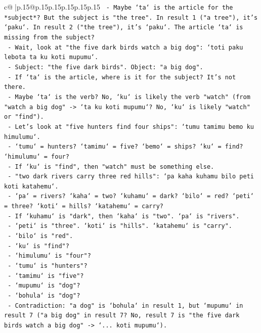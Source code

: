 \documentclass{article}
\begin{document}
{\begin{supertabular}{c@{$\;$}|p{.15\linewidth}@{}p{.15\linewidth}p{.15\linewidth}p{.15\linewidth}p{.15\linewidth}p{.15\linewidth}}
{{{\texttt{         {-} Maybe `ta` is the article for the *subject*? But the subject is "the tree". In result 1 ("a tree"), it's `paku`. In result 2 ("the tree"), it's `paku`. The article `ta` is missing from the subject?} \\
\texttt{         {-} Wait, look at "the five dark birds watch a big dog": `toti paku lebota ta ku koti mupumu`.} \\
\texttt{           {-} Subject: "the five dark birds". Object: "a big dog".} \\
\texttt{           {-} If `ta` is the article, where is it for the subject? It's not there.} \\
\texttt{           {-} Maybe `ta` is the verb? No, `ku` is likely the verb "watch" (from "watch a big dog" {-}> `ta ku koti mupumu`? No, `ku` is likely "watch" or "find").} \\
\texttt{           {-} Let's look at "five hunters find four ships": `tumu tamimu bemo ku himulumu`.} \\
\texttt{             {-} `tumu` = hunters? `tamimu` = five? `bemo` = ships? `ku` = find? `himulumu` = four?} \\
\texttt{             {-} If `ku` is "find", then "watch" must be something else.} \\
\texttt{             {-} "two dark rivers carry three red hills": `pa kaha kuhamu bilo peti koti katahemu`.} \\
\texttt{               {-} `pa` = rivers? `kaha` = two? `kuhamu` = dark? `bilo` = red? `peti` = three? `koti` = hills? `katahemu` = carry?} \\
\texttt{               {-} If `kuhamu` is "dark", then `kaha` is "two". `pa` is "rivers".} \\
\texttt{               {-} `peti` is "three". `koti` is "hills". `katahemu` is "carry".} \\
\texttt{               {-} `bilo` is "red".} \\
\texttt{               {-} `ku` is "find"?} \\
\texttt{               {-} `himulumu` is "four"?} \\
\texttt{               {-} `tumu` is "hunters"?} \\
\texttt{               {-} `tamimu` is "five"?} \\
\texttt{               {-} `mupumu` is "dog"?} \\
\texttt{               {-} `bohula` is "dog"?} \\
\texttt{               {-} Contradiction: "a dog" is `bohula` in result 1, but `mupumu` in result 7 ("a big dog" in result 7? No, result 7 is "the five dark birds watch a big dog" {-}> `... koti mupumu`).} \\
}}}
\end{supertabular}}
\end{document}
